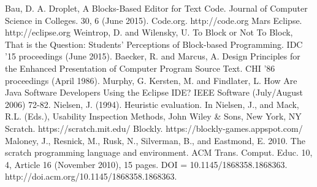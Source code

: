 \documentclass[conference]{IEEEtran}
\begin{document}
\begin{thebibliography}{1}

  Bau, D. A. Droplet, A Blocks-Based Editor for Text Code. Journal of Computer Science in Colleges. 30, 6 (June 2015).
  Code.org. http://code.org
  Mars Eclipse. http://eclipse.org
  Weintrop, D. and Wilensky, U. To Block or Not To Block, That is the Question: Students' Perceptions of Block-based Programming. IDC '15 proceedings (June 2015).
  Baecker, R. and Marcus, A. Design Principles for the Enhanced Presentation of Computer Program Source Text. CHI '86 proceedings (April 1986).
  Murphy, G. Kersten, M. and Findlater, L. How Are Java Software Developers Using the Eclipse IDE? IEEE Software (July/August 2006) 72-82.
  Nielsen, J. (1994). Heuristic evaluation. In Nielsen, J., and Mack, R.L. (Eds.), Usability Inspection Methods, John Wiley \& Sons, New York, NY
  Scratch. https://scratch.mit.edu/
  Blockly. https://blockly-games.appspot.com/
  Maloney, J., Resnick, M., Rusk, N., Silverman, B., and Eastmond, E. 2010. The scratch programming language and environment. ACM Trans. Comput. Educ. 10, 4, Article 16 (November 2010), 15 pages. DOI = 10.1145/1868358.1868363. http://doi.acm.org/10.1145/1868358.1868363.

\end{thebibliography}

\end{document}
